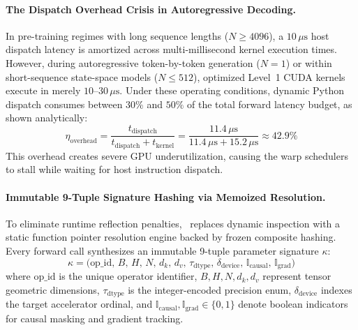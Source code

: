 \paragraph{The Dispatch Overhead Crisis in Autoregressive Decoding.}
In pre-training regimes with long sequence lengths ($N \ge 4096$), a $10\,\mu\text{s}$ host dispatch latency is amortized across multi-millisecond kernel execution times. However, during autoregressive token-by-token generation ($N=1$) or within short-sequence state-space models ($N \le 512$), optimized Level~1 CUDA kernels execute in merely $10\text{--}30\,\mu\text{s}$. Under these operating conditions, dynamic Python dispatch consumes between $30\%$ and $50\%$ of the total forward latency budget, as shown analytically:
\begin{equation}
\label{eq:dispatch_penalty}
\eta_{\text{overhead}} = \frac{t_{\text{dispatch}}}{t_{\text{dispatch}} + t_{\text{kernel}}} = \frac{11.4\,\mu\text{s}}{11.4\,\mu\text{s} + 15.2\,\mu\text{s}} \approx 42.9\%
\end{equation}
This overhead creates severe GPU underutilization, causing the warp schedulers to stall while waiting for host instruction dispatch.

\paragraph{Immutable 9-Tuple Signature Hashing via Memoized Resolution.}
To eliminate runtime reflection penalties, \neuralops\ replaces dynamic inspection with a static function pointer resolution engine backed by frozen composite hashing. Every forward call synthesizes an immutable 9-tuple parameter signature $\kappa$:
\begin{equation}
\label{eq:signature_key}
\kappa = \Big( \text{op\_id}, \, B, \, H, \, N, \, d_k, \, d_v, \, \tau_{\text{dtype}}, \, \delta_{\text{device}}, \, \mathbb{I}_{\text{causal}}, \, \mathbb{I}_{\text{grad}} \Big)
\end{equation}
where $\text{op\_id}$ is the unique operator identifier, $B, H, N, d_k, d_v$ represent tensor geometric dimensions, $\tau_{\text{dtype}}$ is the integer-encoded precision enum, $\delta_{\text{device}}$ indexes the target accelerator ordinal, and $\mathbb{I}_{\text{causal}}, \mathbb{I}_{\text{grad}} \in \{0, 1\}$ denote boolean indicators for causal masking and gradient tracking.

